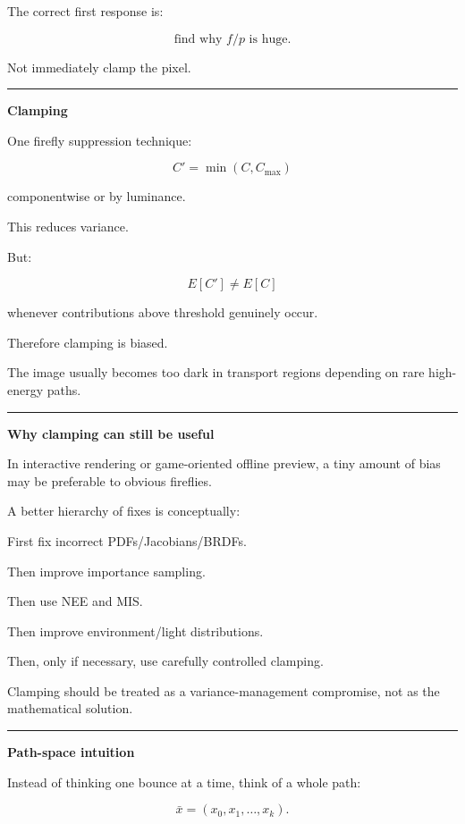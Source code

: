The correct first response is:

\[
\boxed{
\text{find why }f/p\text{ is huge}.
}
\]

Not immediately clamp the pixel.

\begin{center}\rule{0.5\linewidth}{0.5pt}\end{center}

\textbf{Clamping}

One firefly suppression technique:

\[
C'=
\min(C,C_{\max})
\]

componentwise or by luminance.

This reduces variance.

But:

\[
E[C']\neq E[C]
\]

whenever contributions above threshold genuinely occur.

Therefore clamping is biased.

The image usually becomes too dark in transport regions depending on rare high-energy paths.

\begin{center}\rule{0.5\linewidth}{0.5pt}\end{center}

\textbf{Why clamping can still be useful}

In interactive rendering or game-oriented offline preview, a tiny amount of bias may be preferable to obvious fireflies.

A better hierarchy of fixes is conceptually:

First fix incorrect PDFs/Jacobians/BRDFs.

Then improve importance sampling.

Then use NEE and MIS.

Then improve environment/light distributions.

Then, only if necessary, use carefully controlled clamping.

Clamping should be treated as a variance-management compromise, not as the mathematical solution.

\begin{center}\rule{0.5\linewidth}{0.5pt}\end{center}

\textbf{Path-space intuition}

Instead of thinking one bounce at a time, think of a whole path:

\[
\boxed{
\bar x
=
(x_0,x_1,\dots,x_k).
}
\]

